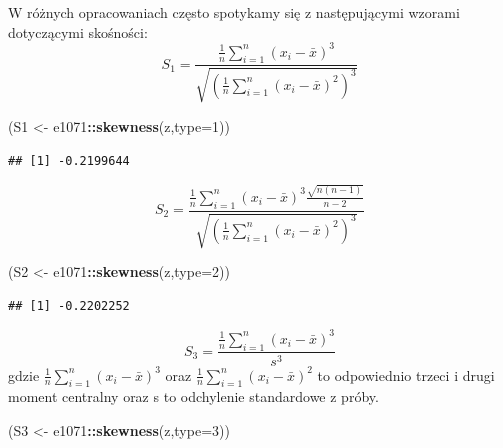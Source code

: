 \documentclass[polish,]{book}
\newenvironment{Shaded}{\begin{snugshade}}{\end{snugshade}}
\newcommand{\DataTypeTok}[1]{\textcolor[rgb]{0.13,0.29,0.53}{#1}}
\newcommand{\DecValTok}[1]{\textcolor[rgb]{0.00,0.00,0.81}{#1}}
\newcommand{\KeywordTok}[1]{\textcolor[rgb]{0.13,0.29,0.53}{\textbf{#1}}}
\newcommand{\NormalTok}[1]{#1}
\newcommand{\OperatorTok}[1]{\textcolor[rgb]{0.81,0.36,0.00}{\textbf{#1}}}
\newcommand{\StringTok}[1]{\textcolor[rgb]{0.31,0.60,0.02}{#1}}
\begin{document}
W różnych opracowaniach często spotykamy się z następującymi wzorami dotyczącymi skośności:
\begin{equation}
S_{1}=\frac{\frac{1}{n}\sum_{i=1}^{n}(x_i-\bar{x})^3}{\sqrt{\left(\frac{1}{n}\sum_{i=1}^{n}(x_i-\bar{x})^2\right)^3}}
\label{eq:wz914}
\end{equation}

\begin{Shaded}
\begin{Highlighting}[]
\NormalTok{(S1 <-}\StringTok{ }\NormalTok{e1071}\OperatorTok{::}\KeywordTok{skewness}\NormalTok{(z,}\DataTypeTok{type=}\DecValTok{1}\NormalTok{))}
\end{Highlighting}
\end{Shaded}

\begin{verbatim}
## [1] -0.2199644
\end{verbatim}

\begin{equation}
S_{2}=\frac{\frac{1}{n}\sum_{i=1}^{n}(x_i-\bar{x})^3\frac{\sqrt{n(n-1)}}{n-2}}{\sqrt{\left(\frac{1}{n}\sum_{i=1}^{n}(x_i-\bar{x})^2\right)^3}}
\label{eq:wz915}
\end{equation}

\begin{Shaded}
\begin{Highlighting}[]
\NormalTok{(S2 <-}\StringTok{ }\NormalTok{e1071}\OperatorTok{::}\KeywordTok{skewness}\NormalTok{(z,}\DataTypeTok{type=}\DecValTok{2}\NormalTok{))}
\end{Highlighting}
\end{Shaded}

\begin{verbatim}
## [1] -0.2202252
\end{verbatim}

\begin{equation}
S_{3}=\frac{\frac{1}{n}\sum_{i=1}^{n}(x_i-\bar{x})^3}{s^3}
\label{eq:wz916}
\end{equation}
gdzie \(\frac{1}{n}\sum_{i=1}^{n}(x_i-\bar{x})^3\) oraz \(\frac{1}{n}\sum_{i=1}^{n}(x_i-\bar{x})^2\) to odpowiednio trzeci i drugi moment
centralny oraz s to odchylenie standardowe z próby.

\begin{Shaded}
\begin{Highlighting}[]
\NormalTok{(S3 <-}\StringTok{ }\NormalTok{e1071}\OperatorTok{::}\KeywordTok{skewness}\NormalTok{(z,}\DataTypeTok{type=}\DecValTok{3}\NormalTok{))}
\end{Highlighting}
\end{Shaded}
\end{document}
